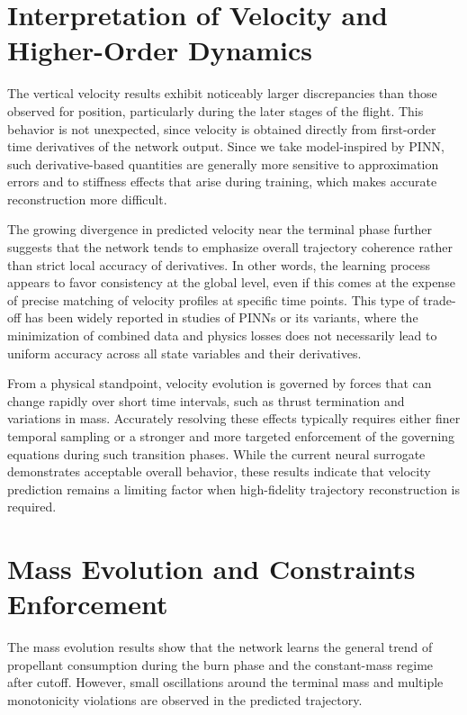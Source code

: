 \section{Interpretation of Velocity and Higher-Order Dynamics}

The vertical velocity results exhibit noticeably larger discrepancies than those observed for 
position, particularly during the later stages of the flight. This behavior is not unexpected, since 
velocity is obtained directly from first-order time derivatives of the network output. Since we take 
model-inspired by PINN, such derivative-based quantities are generally more sensitive to approximation 
errors and to stiffness effects that arise during training, which makes accurate reconstruction more 
difficult.

The growing divergence in predicted velocity near the terminal phase further suggests that the network 
tends to emphasize overall trajectory coherence rather than strict local accuracy of derivatives. In 
other words, the learning process appears to favor consistency at the global level, even if this comes 
at the expense of precise matching of velocity profiles at specific time points. This type of trade-off 
has been widely reported in studies of PINNs or its variants, where the minimization of combined data 
and physics losses does not necessarily lead to uniform accuracy across all state variables and their 
derivatives.

From a physical standpoint, velocity evolution is governed by forces that can change rapidly over short 
time intervals, such as thrust termination and variations in mass. Accurately resolving these effects 
typically requires either finer temporal sampling or a stronger and more targeted enforcement of the 
governing equations during such transition phases. While the current neural surrogate demonstrates 
acceptable overall behavior, these results indicate that velocity prediction remains a limiting factor 
when high-fidelity trajectory reconstruction is required.

\section{Mass Evolution and Constraints Enforcement}

The mass evolution results show that the network learns the general trend of propellant 
consumption during the burn phase and the constant-mass regime after cutoff. However, 
small oscillations around the terminal mass and multiple monotonicity violations are observed 
in the predicted trajectory.

